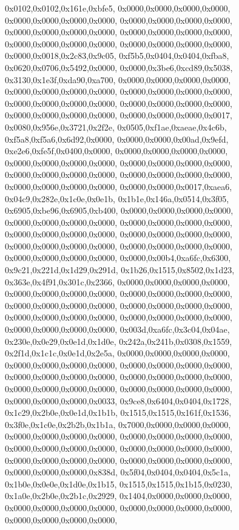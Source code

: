 {	0x0102,0x0102,0x161e,0xbfe5,
	0x0000,0x0000,0x0000,0x0000,
	0x0000,0x0000,0x0000,0x0000,
	0x0000,0x0000,0x0000,0x0000,
	0x0000,0x0000,0x0000,0x0000,
	0x0000,0x0000,0x0000,0x0000,
	0x0000,0x0000,0x0000,0x0000,
	0x0000,0x0000,0x0000,0x0000,
	0x0000,0x0018,0x2c83,0x9c05,
	0xf5b5,0x0404,0x0404,0xfba8,
	0x0620,0x0706,0x5492,0x0000,
	0x0000,0x3be6,0xcd89,0x5038,
	0x3130,0x1e3f,0xda90,0xa700,
	0x0000,0x0000,0x0000,0x0000,
	0x0000,0x0000,0x0000,0x0000,
	0x0000,0x0000,0x0000,0x0000,
	0x0000,0x0000,0x0000,0x0000,
	0x0000,0x0000,0x0000,0x0000,
	0x0000,0x0000,0x0000,0x0000,
	0x0000,0x0000,0x0000,0x0017,
	0x0080,0x956e,0x3721,0x2f2e,
	0x0505,0xf1ae,0xaeae,0x4c6b,
	0xf5a8,0xf5a6,0x6d92,0x0000,
	0x0000,0x0000,0x00ad,0x9efd,
	0xe2e6,0xfe5f,0x0400,0x0000,
	0x0000,0x0000,0x0000,0x0000,
	0x0000,0x0000,0x0000,0x0000,
	0x0000,0x0000,0x0000,0x0000,
	0x0000,0x0000,0x0000,0x0000,
	0x0000,0x0000,0x0000,0x0000,
	0x0000,0x0000,0x0000,0x0000,
	0x0000,0x0000,0x0017,0xaea6,
	0x04c9,0x282e,0x1c0e,0x0e1b,
	0x1b1e,0x146a,0x0514,0x3f05,
	0x6905,0xbe96,0x6905,0xb400,
	0x0000,0x0000,0x0000,0x0000,
	0x0000,0x0000,0x0000,0x0000,
	0x0000,0x0000,0x0000,0x0000,
	0x0000,0x0000,0x0000,0x0000,
	0x0000,0x0000,0x0000,0x0000,
	0x0000,0x0000,0x0000,0x0000,
	0x0000,0x0000,0x0000,0x0000,
	0x0000,0x0000,0x0000,0x0000,
	0x0000,0x00b4,0xa6fc,0x6300,
	0x9c21,0x221d,0x1d29,0x291d,
	0x1b26,0x1515,0x8502,0x1d23,
	0x363e,0x4f91,0x301c,0x2366,
	0x0000,0x0000,0x0000,0x0000,
	0x0000,0x0000,0x0000,0x0000,
	0x0000,0x0000,0x0000,0x0000,
	0x0000,0x0000,0x0000,0x0000,
	0x0000,0x0000,0x0000,0x0000,
	0x0000,0x0000,0x0000,0x0000,
	0x0000,0x0000,0x0000,0x0000,
	0x0000,0x0000,0x0000,0x0000,
	0x003d,0xa6fc,0x3c04,0x04ae,
	0x230e,0x0e29,0x0e1d,0x1d0e,
	0x242a,0x241b,0x0308,0x1559,
	0x2f1d,0x1c1c,0x0e1d,0x2e5a,
	0x0000,0x0000,0x0000,0x0000,
	0x0000,0x0000,0x0000,0x0000,
	0x0000,0x0000,0x0000,0x0000,
	0x0000,0x0000,0x0000,0x0000,
	0x0000,0x0000,0x0000,0x0000,
	0x0000,0x0000,0x0000,0x0000,
	0x0000,0x0000,0x0000,0x0000,
	0x0000,0x0000,0x0000,0x0033,
	0x9ce8,0x6404,0x0404,0x1728,
	0x1c29,0x2b0e,0x0e1d,0x1b1b,
	0x1515,0x1515,0x161f,0x1536,
	0x3f0e,0x1c0e,0x2b2b,0x1b1a,
	0x7000,0x0000,0x0000,0x0000,
	0x0000,0x0000,0x0000,0x0000,
	0x0000,0x0000,0x0000,0x0000,
	0x0000,0x0000,0x0000,0x0000,
	0x0000,0x0000,0x0000,0x0000,
	0x0000,0x0000,0x0000,0x0000,
	0x0000,0x0000,0x0000,0x0000,
	0x0000,0x0000,0x0000,0x838d,
	0x5f04,0x0404,0x0404,0x5c1a,
	0x1b0e,0x0e0e,0x1d0e,0x1b15,
	0x1515,0x1515,0x1b15,0x0230,
	0x1a0e,0x2b0e,0x2b1c,0x2929,
	0x1404,0x0000,0x0000,0x0000,
	0x0000,0x0000,0x0000,0x0000,
	0x0000,0x0000,0x0000,0x0000,
	0x0000,0x0000,0x0000,0x0000,
}
